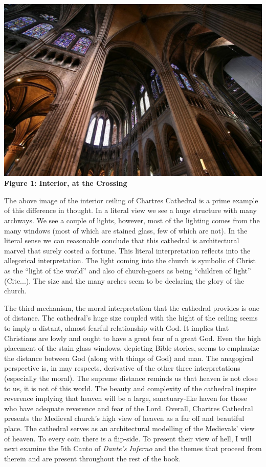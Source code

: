 \documentclass[12pt]{article}
\begin{document}
\begin{flushleft}
\begin{center}
\includegraphics[scale=0.3]{InteriorAtTheCrossing.png} \\
{\bf Figure 1: Interior, at the Crossing}
\end{center}

The above image of the interior ceiling of Chartres Cathedral is a prime
example of this difference in thought. In a literal
view we see a huge structure with many archways. We see a couple of 
lights, however, most of the lighting comes from the many windows
(most of which are stained glass, few of which are not). In the literal
sense we can reasonable conclude that this cathedral is architectural
marvel that surely costed a fortune. This literal interpretation 
reflects into the allegorical interpretation. The light coming into the
church is symbolic of Christ as the ``light of the world'' and also of
church-goers as being ``children of light'' (Cite...). The size and the
many arches seem to be declaring the glory of the church.

The third mechanism, the moral interpretation that the cathedral provides
is one of distance. The cathedral's huge size coupled with the hight of
the ceiling seems to imply a distant, almost fearful relationship with God.
It implies that Christians are lowly and ought to have a great fear of a
great God. Even the high placement of the stain glass windows, depicting
Bible stories, seems to emphasize the distance between God (along with things of
God) and man. The anagogical perspective is, in may respects, derivative
of the other three interpretations (especially the moral). The supreme distance
reminds us that heaven is not close to us, it is not of this world. The beauty
and complexity of the cathedral inspire reverence implying that heaven will
be a large, sanctuary-like haven for those who have adequate reverence and fear
of the Lord. Overall, Chartres Cathedral presents the Medieval church's
high view of heaven as a far off and beautiful place. The cathedral serves
as an architectural modelling of the Medievals' view of heaven. To every coin
there is a flip-side. To present their view of hell, I will next examine the
5th Canto of \emph{Dante's Inferno} and the themes that proceed from therein and
are present throughout the rest of the book.


\end{flushleft}
\end{document}

